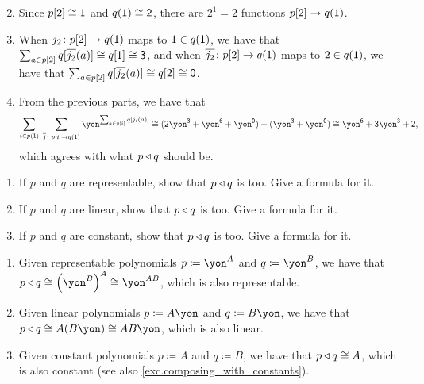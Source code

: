 \documentclass[Book-Poly]{subfiles}
\begin{document}
\begin{exercise}
\begin{solution}
\begin{enumerate}
\[    \]
    \item Since $p[2] \cong \textsf{1}$ and $q(\textsf{1}) \cong \textsf{2}$, there are $2^1 = 2$ functions $p[2] \to q(\textsf{1})$.
    \item When $j_2 \colon p[2] \to q(\textsf{1})$ maps to $1 \in q(\textsf{1})$, we have that $\sum_{a \in p[2]} q[\overline{j_2}(a)] \cong q[1] \cong \textsf{3}$, and when $\overline{j_2} \colon p[2] \to q(\textsf{1})$ maps to $2 \in q(\textsf{1})$, we have that $\sum_{a \in p[2]} q[\overline{j_2}(a)] \cong q[2] \cong \textsf{0}$.
    \item From the previous parts, we have that
    \[
        \sum_{i\in p(\1)}\;\sum_{\ol{j}\colon p[i]\to q(\1)}\yon^{\sum_{a\in p[i]}q[j_i(a)]} \iso (\2\yon^\3 + \yon^\6 + \yon^\0) + (\yon^\3 + \yon^\0) \iso \yon^\6 + \3\yon^\3 + \2,
    \]
    which agrees with what $p \mathbin{\triangleleft} q$ should be.
\end{enumerate}
\end{solution}
\end{exercise}


\begin{exercise}\label{exc.composites_of_specials}
\begin{enumerate}
	\item If $p$ and $q$ are representable, show that $p\mathbin{\triangleleft} q$ is too. Give a formula for it.
	\item If $p$ and $q$ are linear, show that $p\mathbin{\triangleleft} q$ is too. Give a formula for it.
	\item If $p$ and $q$ are constant, show that $p\mathbin{\triangleleft} q$ is too. Give a formula for it.
\qedhere
\end{enumerate}
\begin{solution}
\begin{enumerate}
	\item Given representable polynomials $p \coloneqq \yon^A$ and $q \coloneqq \yon^B$, we have that $p \tri q \iso \left(\yon^B\right)^A \iso \yon^{AB}$, which is also representable.
	\item Given linear polynomials $p \coloneqq A\yon$ and $q \coloneqq B\yon$, we have that $p \tri q \iso A(B\yon) \iso AB\yon$, which is also linear.
	\item Given constant polynomials $p \coloneqq A$ and $q \coloneqq B$, we have that $p \mathbin{\triangleleft} q \cong A$, which is also constant (see also \cref{exc.composing_with_constants}).
\end{enumerate}
\end{solution}
\end{exercise}
\end{document}
